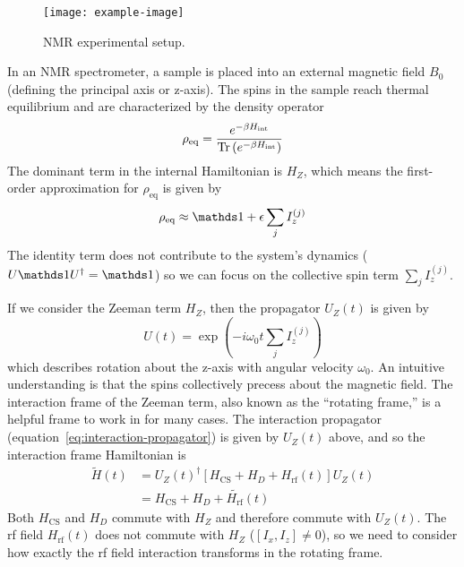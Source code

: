 \begin{figure}[H]
    \centering
    \texttt{[image: example-image]}
    \caption{NMR experimental setup.}
    \label{fig:NMR-setup}
\end{figure}

In an NMR spectrometer, a sample is placed into an external magnetic field $B_0$ (defining the principal axis or z-axis). The spins in the sample reach thermal equilibrium and are characterized by the density operator
\[
\rho_{\text{eq}} = \frac{
    e^{-\beta H_{\text{int}}}
    }{
    \text{Tr}\left( 
        e^{-\beta H_{\text{int}}}
      \right)
    }
\]
The dominant term in the internal Hamiltonian is $H_Z$, which means the first-order approximation for $\rho_{\text{eq}}$ is given by
\[
\rho_{\text{eq}} \approx \identity + \epsilon \sum_j I_z^{(j)}
\]
The identity term does not contribute to the system's dynamics ($U \identity U^\dagger = \identity$) so we can focus on the collective spin term $\sum_j I_z^{(j)}$.

If we consider the Zeeman term $H_Z$, then the propagator $U_Z(t)$ is given by
\[
U(t) = \exp \left( -i \omega_0 t \sum_j I_z^{(j)} \right)
\]
which describes rotation about the z-axis with angular velocity $\omega_0$. An intuitive understanding is that the spins collectively precess about the magnetic field. The interaction frame of the Zeeman term, also known as the ``rotating frame,'' is a helpful frame to work in for many cases. The interaction propagator (equation~\ref{eq:interaction-propagator}) is given by $U_Z(t)$ above, and so the interaction frame Hamiltonian is
\begin{align*}
    \widetilde{H}(t) &= {U_Z(t)}^{\dagger} \left[ H_\text{CS} + H_D + H_\text{rf}(t) \right] U_Z(t) \\
        &= H_\text{CS} + H_D + \widetilde{H_\text{rf}}(t)
\end{align*}
Both $H_\text{CS}$ and $H_D$ commute with $H_Z$ and therefore commute with $U_Z(t)$. The rf field $H_\text{rf}(t)$ does not commute with $H_Z$ ($[I_x, I_z] \ne 0$), so we need to consider how exactly the rf field interaction transforms in the rotating frame.

